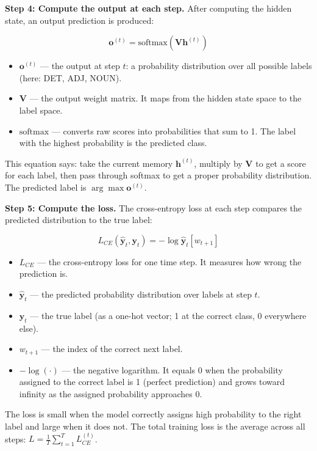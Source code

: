 \documentclass[12pt,a4paper]{article}
\begin{document}
\medskip
\noindent\textbf{Step 4: Compute the output at each step.}
After computing the hidden state, an output prediction is produced:

\[
\mathbf{o}^{(t)} = \text{softmax}\!\left(\mathbf{V}\mathbf{h}^{(t)}\right)
\]

\begin{itemize}
  \item $\mathbf{o}^{(t)}$ --- the output at step $t$: a probability distribution over
        all possible labels (here: DET, ADJ, NOUN).
  \item $\mathbf{V}$ --- the output weight matrix. It maps from the hidden state space
        to the label space.
  \item $\text{softmax}$ --- converts raw scores into probabilities that sum to 1.
        The label with the highest probability is the predicted class.
\end{itemize}

This equation says: take the current memory $\mathbf{h}^{(t)}$, multiply by $\mathbf{V}$
to get a score for each label, then pass through softmax to get a proper probability
distribution. The predicted label is $\arg\max \mathbf{o}^{(t)}$.

\medskip
\noindent\textbf{Step 5: Compute the loss.}
The cross-entropy loss at each step compares the predicted distribution to the true label:

\[
L_{CE}\!\left(\hat{\mathbf{y}}_t, \mathbf{y}_t\right) = -\log \hat{\mathbf{y}}_t[w_{t+1}]
\]

\begin{itemize}
  \item $L_{CE}$ --- the cross-entropy loss for one time step. It measures how wrong the
        prediction is.
  \item $\hat{\mathbf{y}}_t$ --- the predicted probability distribution over labels at
        step $t$.
  \item $\mathbf{y}_t$ --- the true label (as a one-hot vector; 1 at the correct class,
        0 everywhere else).
  \item $w_{t+1}$ --- the index of the correct next label.
  \item $-\log(\cdot)$ --- the negative logarithm. It equals 0 when the probability
        assigned to the correct label is 1 (perfect prediction) and grows toward infinity
        as the assigned probability approaches 0.
\end{itemize}

The loss is small when the model correctly assigns high probability to the right label
and large when it does not. The total training loss is the average across all steps:
$L = \frac{1}{T}\sum_{t=1}^{T} L_{CE}^{(t)}$.
\end{document}
